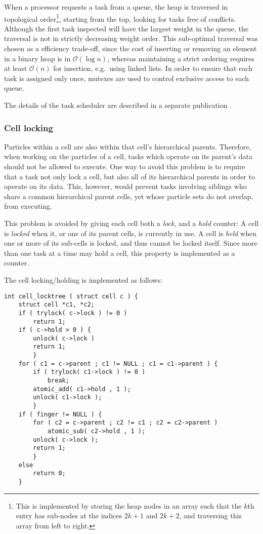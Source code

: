 \documentclass[final]{siamltex}
\newcommand{\oh}[1]
    {\mbox{$ {\mathcal O}( #1 ) $}}
\begin{document}
When a processor requests a task from a queue, the heap is
traversed in topological order\footnote{
This is implemented by storing the heap nodes in an array such that the $k$th
entry has sub-nodes at the indices $2k+1$ and $2k+2$, and traversing
this array from left to right.}, starting from the top, looking
for tasks free of conflicts.
Although the first task inspected will have the largest weight
in the queue, the traversal is not in strictly decreasing weight
order.
This sub-optimal traversal was chosen as a efficiency trade-off,
since the cost of inserting or removing an element in a binary heap is in
\oh{\log n}, whereas maintaining a strict ordering requires
at least \oh{n} for insertion, e.g.~using linked lists.
In order to ensure that each task is assigned only once, mutexes
are used to control exclusive access to each queue.

The details of the task scheduler are described in a separate
publication \cite{ref:Gonnet2013b}.


\subsubsection{Cell locking}
\label{sec:locking}

Particles within a cell are also within that cell's hierarchical
parents.
Therefore, when working on the particles of a cell, tasks which
operate on its parent's data should not be allowed to execute.
One way to avoid this problem is to require that a task
not only lock a cell, but also all of its hierarchical
parents in order to operate on its data.
This, however, would prevent tasks involving siblings who share
a common hierarchical parent cells, yet
whose particle sets do not overlap, from executing.

This problem is avoided by giving each cell both a {\em lock},
and a {\em hold} counter:
A cell is {\em locked} when it, or one of its parent cells, is currently
in use. A cell is {\em held} when one or more of its sub-cells is locked,
and thus cannot be locked itself.
Since more than one task at a time may hold a cell, this property
is implemented as a counter.

The cell locking/holding is implemented as follows:
        
\begin{center}\begin{minipage}{0.8\textwidth}
    \begin{lstlisting}
int cell_locktree ( struct cell c ) {
    struct cell *c1, *c2;
    if ( trylock( c->lock ) != 0 )
        return 1;
    if ( c->hold > 0 ) {
        unlock( c->lock )
        return 1;
        }
    for ( c1 = c->parent ; c1 != NULL ; c1 = c1->parent ) {
        if ( trylock( c1->lock ) != 0 )
            break;
        atomic_add( c1->hold , 1 );
        unlock( c1->lock );
        }
    if ( finger != NULL ) {
        for ( c2 = c->parent ; c2 != c1 ; c2 = c2->parent )
            atomic_sub( c2->hold , 1 );
        unlock( c->lock );
        return 1;
        }
    else
        return 0;
    }
    \end{lstlisting}
\end{minipage}\end{center}
\end{document}

